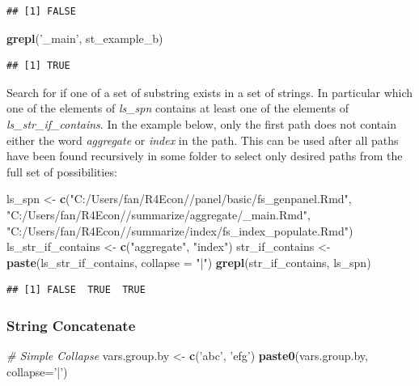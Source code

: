 \documentclass[
]{book}
\newenvironment{Shaded}{\begin{snugshade}}{\end{snugshade}}
\newcommand{\CommentTok}[1]{\textcolor[rgb]{0.56,0.35,0.01}{\textit{#1}}}
\newcommand{\DataTypeTok}[1]{\textcolor[rgb]{0.13,0.29,0.53}{#1}}
\newcommand{\KeywordTok}[1]{\textcolor[rgb]{0.13,0.29,0.53}{\textbf{#1}}}
\newcommand{\NormalTok}[1]{#1}
\newcommand{\StringTok}[1]{\textcolor[rgb]{0.31,0.60,0.02}{#1}}
\begin{document}
\begin{verbatim}
## [1] FALSE
\end{verbatim}

\begin{Shaded}
\begin{Highlighting}[]
\KeywordTok{grepl}\NormalTok{(}\StringTok{'_main'}\NormalTok{, st_example_b)}
\end{Highlighting}
\end{Shaded}

\begin{verbatim}
## [1] TRUE
\end{verbatim}

Search for if one of a set of substring exists in a set of strings. In particular which one of the elements of \emph{ls\_spn} contains at least one of the elements of \emph{ls\_str\_if\_contains}. In the example below, only the first path does not contain either the word \emph{aggregate} or \emph{index} in the path. This can be used after all paths have been found recursively in some folder to select only desired paths from the full set of possibilities:

\begin{Shaded}
\begin{Highlighting}[]
\NormalTok{ls_spn <-}\StringTok{ }\KeywordTok{c}\NormalTok{(}\StringTok{"C:/Users/fan/R4Econ//panel/basic/fs_genpanel.Rmd"}\NormalTok{,}
            \StringTok{"C:/Users/fan/R4Econ//summarize/aggregate/_main.Rmd"}\NormalTok{,}
            \StringTok{"C:/Users/fan/R4Econ//summarize/index/fs_index_populate.Rmd"}\NormalTok{)}
\NormalTok{ls_str_if_contains <-}\StringTok{ }\KeywordTok{c}\NormalTok{(}\StringTok{"aggregate"}\NormalTok{, }\StringTok{"index"}\NormalTok{)}
\NormalTok{str_if_contains <-}\StringTok{ }\KeywordTok{paste}\NormalTok{(ls_str_if_contains, }\DataTypeTok{collapse =} \StringTok{"|"}\NormalTok{)}
\KeywordTok{grepl}\NormalTok{(str_if_contains, ls_spn)}
\end{Highlighting}
\end{Shaded}

\begin{verbatim}
## [1] FALSE  TRUE  TRUE
\end{verbatim}

\hypertarget{string-concatenate}{%
\subsubsection{String Concatenate}\label{string-concatenate}}

\begin{Shaded}
\begin{Highlighting}[]
\CommentTok{# Simple Collapse}
\NormalTok{vars.group.by <-}\StringTok{ }\KeywordTok{c}\NormalTok{(}\StringTok{'abc'}\NormalTok{, }\StringTok{'efg'}\NormalTok{)}
\KeywordTok{paste0}\NormalTok{(vars.group.by, }\DataTypeTok{collapse=}\StringTok{'|'}\NormalTok{)}
\end{Highlighting}
\end{Shaded}
\end{document}
